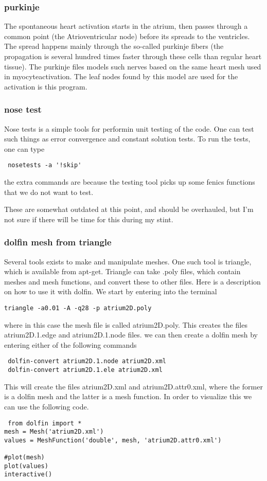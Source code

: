 \subsubsection{purkinje}
The spontaneous heart activation starts in the atrium, then passes through a common point (the Atrioventricular node) before its spreads to the ventricles. The spread happens mainly through the so-called purkinje fibers (the propagation is several hundred times faster through these cells than regular heart tissue). The purkinje files models such nerves based on the same heart mesh used in myocyte\textunderscore activation. The leaf nodes found by this model are used for the activation is this program. 

\subsubsection{nose test}
Nose tests is a simple tools for performin unit testing of the code. One can test such things as error convergence and constant solution tests. To run the tests, one can type 
\begin{lstlisting}
 nosetests -a '!skip'
\end{lstlisting}
the extra commands are because the testing tool picks up some fenics functions that we do not want to test. 

These are somewhat outdated at this point, and should be overhauled, but I'm not sure if there will be time for this during my stint. 


\subsubsection{dolfin mesh from triangle}
Several tools exists to make and manipulate meshes. One such tool is triangle, which is available from apt-get. Triangle can take .poly files, which contain meshes and mesh functions, and convert these to other files. Here is a description on how to use it with dolfin. We start by entering into the terminal 
\begin{verbatim}
triangle -a0.01 -A -q28 -p atrium2D.poly
\end{verbatim}
where in this case the mesh file is called atrium2D.poly. This creates the files atrium2D.1.edge and atrium2D.1.node files. we can then create a dolfin mesh by entering either of the following commands
\begin{verbatim}
 dolfin-convert atrium2D.1.node atrium2D.xml
 dolfin-convert atrium2D.1.ele atrium2D.xml
\end{verbatim}
This will create the files atrium2D.xml and atrium2D.attr0.xml, where the former is a dolfin mesh and the latter is a mesh function. In order to visualize this we can use the following code. 
\begin{lstlisting}
 from dolfin import *
mesh = Mesh('atrium2D.xml')
values = MeshFunction('double', mesh, 'atrium2D.attr0.xml')

#plot(mesh)
plot(values)
interactive()
\end{lstlisting}


